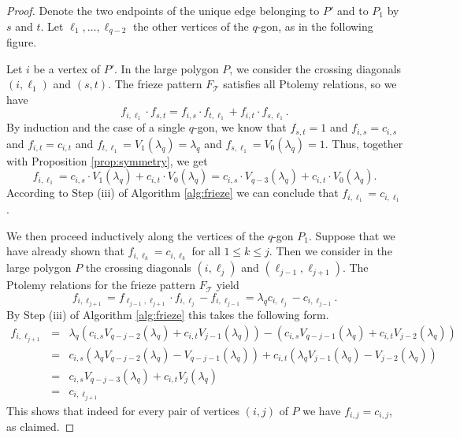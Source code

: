 \documentclass[11pt,a4paper]{amsart}
\theoremstyle{definition}
\numberwithin{equation}{section}
\begin{document}
\begin{proof}
Denote the 
two endpoints of the unique edge belonging to $P'$ and to $P_1$ by $s$ and $t$. Let $\ell_1,\ldots,
\ell_{q-2}$ the other vertices of the $q$-gon, as in the following figure.
\begin{center}
\end{center}
Let $i$ be a vertex of $P'$. 
In the large polygon $P$, we consider the crossing diagonals $(i,\ell_1)$ and $(s,t)$. The frieze pattern $F_{\mathcal{T}}$
satisfies all Ptolemy relations, so we have
$$f_{i,\ell_1}\cdot f_{s,t} = f_{i,s}\cdot f_{t,\ell_1} + f_{i,t}\cdot f_{s,\ell_1}.
$$
By induction and the case of a single $q$-gon, we know that $f_{s,t}=1$ and $f_{i,s}=c_{i,s}$ and $f_{i,t}=c_{i,t}$
and $f_{t,\ell_1}=V_1(\lambda_q)=\lambda_q$ and $f_{s,\ell_1}=V_0(\lambda_q)=1$.
Thus, together with Proposition \ref{prop:symmetry}, we get
$$f_{i,\ell_1} = c_{i,s}\cdot V_1(\lambda_q) + c_{i,t}\cdot V_0(\lambda_q)
= c_{i,s}\cdot V_{q-3}(\lambda_q) + c_{i,t}\cdot V_0(\lambda_q).
$$
According to Step (iii) of Algorithm \ref{alg:frieze} we can conclude that $f_{i,\ell_1}=c_{i,\ell_1}$. 

We then proceed inductively along the vertices of the $q$-gon $P_1$. Suppose that we have already shown that
$f_{i,\ell_k} = c_{i,\ell_k}$ for all $1\le k\le j$. Then we consider in the large polygon $P$ the crossing 
diagonals $(i,\ell_j)$ and $(\ell_{j-1},\ell_{j+1})$. The Ptolemy relations for the frieze pattern $F_{\mathcal{T}}$ 
yield
$$f_{i,\ell_{j+1}} = f_{\ell_{j-1},\ell_{j+1}}\cdot f_{i,\ell_j} - f_{i,\ell_{j-1}}
= \lambda_q c_{i,\ell_j} - c_{i,\ell_{j-1}}.
$$
By Step (iii) of Algorithm \ref{alg:frieze} this takes the following form.
\begin{eqnarray*}f_{i,\ell_{j+1}} & = & \lambda_q (c_{i,s}V_{q-j-2}(\lambda_q) + c_{i,t}V_{j-1}(\lambda_q))
- (c_{i,s}V_{q-j-1}(\lambda_q) + c_{i,t}V_{j-2}(\lambda_q)) \\
& = & c_{i,s}( \lambda_q V_{q-j-2}(\lambda_q) - V_{q-j-1}(\lambda_q)) 
+ c_{i,t} ( \lambda_q V_{j-1}(\lambda_q) - V_{j-2}(\lambda_q)) \\
& = & c_{i,s} V_{q-j-3}(\lambda_q) + c_{i,t}V_j(\lambda_q) \\
& = & c_{i,\ell_{j+1}}
\end{eqnarray*}
This shows that indeed for every pair of vertices $(i,j)$ of $P$ we have $f_{i,j}=c_{i,j}$, as claimed. 
\end{proof}
\end{document}
